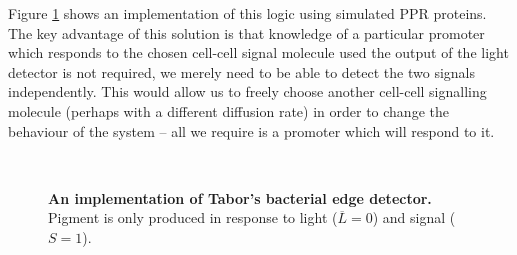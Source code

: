 Figure \ref{fig:tabor_simulation} shows an implementation of this logic using
simulated PPR proteins.
The key advantage of this solution is that knowledge of a particular promoter
which responds to the chosen cell-cell signal molecule used the output of the
light detector is not required, we merely need to be able to detect the two
signals independently.
This would allow us to freely choose another cell-cell signalling molecule
(perhaps with a different diffusion rate) in order to change the behaviour of
the system -- all we require is a promoter which will respond to it.

\begin{figure}
  \begin{center}
    \begin{subfigure}{0.25\textwidth}
      \centering
    \end{subfigure}
    ~
    \begin{subfigure}{0.7\textwidth}
      \centering
    \end{subfigure}
  \end{center}
  \caption{\textbf{An implementation of Tabor's bacterial edge detector.}
    Pigment is only produced in response to light ($\overline{L}=0$) and signal
    ($S=1$).
    \label{fig:tabor_simulation}}
\end{figure}

